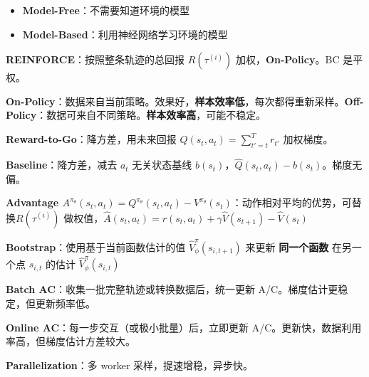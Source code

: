 \documentclass[
  8pt]{extarticle}
\providecommand{\tightlist}{%
  \setlength{\itemsep}{0pt}\setlength{\parskip}{0pt}}
\begin{document}
\begin{multicols*}{4}
\begin{itemize}
\tightlist
\item
  \textbf{Model-Free}：不需要知道环境的模型
\item
  \textbf{Model-Based}：利用神经网络学习环境的模型
\end{itemize}

\textbf{REINFORCE}：按照整条轨迹的总回报 \(R(\tau^{(i)})\)
加权，\textbf{On-Policy}。BC 是平权。

\textbf{On-Policy}：数据来自当前策略。效果好，\textbf{样本效率低}，每次都得重新采样。\textbf{Off-Policy}：数据可来自不同策略。\textbf{样本效率高}，可能不稳定。

\textbf{Reward-to-Go}：降方差，用未来回报
\(\hat{Q}(s_t, a_t) = \sum_{t'=t}^{T} r_{t'}\) 加权梯度。

\textbf{Baseline}：降方差，减去 \(a_t\) 无关状态基线
\(b(s_t)\)，\(\hat{Q}(s_t, a_t) - b(s_t)\)。梯度无偏。

\textbf{Advantage
\(A^{\pi_\theta}(s_t, a_t) = Q^{\pi_\theta}(s_t, a_t) - V^{\pi_\theta}(s_t)\)}：动作相对平均的优势，可替换\(R(\tau^{(i)})\)
做权值，\(\hat{A}(s_t, a_t) = r(s_t, a_t) + \gamma \hat{V}(s_{t+1}) - \hat{V}(s_t)\)

\textbf{Bootstrap}：使用基于当前函数估计的值
\(\hat{V}_{\phi}^{\pi}(s_{i,t+1})\) 来更新 \textbf{同一个函数}
在另一个点 \(s_{i,t}\) 的估计 \(\hat{V}_{\phi}^{\pi}(s_{i,t})\)

\textbf{Batch AC}：收集一批完整轨迹或转换数据后，统一更新
A/C。梯度估计更稳定，但更新频率低。

\textbf{Online AC}：每一步交互（或极小批量）后，立即更新
A/C。更新快，数据利用率高，但梯度估计方差较大。

\textbf{Parallelization}：多 worker 采样，提速增稳，异步快。

\end{multicols*}
\end{document}
